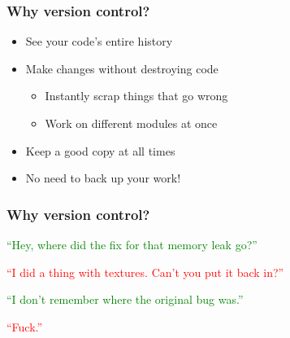 \documentclass[glossy]{beamer}
\begin{document}
\begin{frame}[fragile=singleslide]
  \frametitle{Why version control?}

  \begin{itemize}
    \item See your code's entire history
    \item Make changes without destroying code
    \begin{itemize}
      \item Instantly scrap things that go wrong
      \item Work on different modules at once
    \end{itemize}
    \item Keep a good copy at all times
    \item No need to back up your work!
  \end{itemize}
\end{frame}

\begin{frame}[fragile=singleslide]
  \frametitle{Why version control?}

  \textcolor{green}{\enquote{Hey, where did the fix for that memory leak go?}}
  \begin{flushright}
    \textcolor{red}{\enquote{I did a thing with textures. Can't you put it back in?}}
  \end{flushright}
  \textcolor{green}{\enquote{I don't remember where the original bug was.}}
  \begin{flushright}
    \textcolor{red}{\enquote{Fuck.}}
  \end{flushright}

  \begin{columns}[b]
    \begin{column}{6cm}
      \begin{figure}
        \centering
        
      \end{figure}
    \end{column}

    \begin{column}{6cm}
      \begin{figure}
        \centering
        
      \end{figure}
    \end{column}

  \end{columns}
\end{frame}
\end{document}

